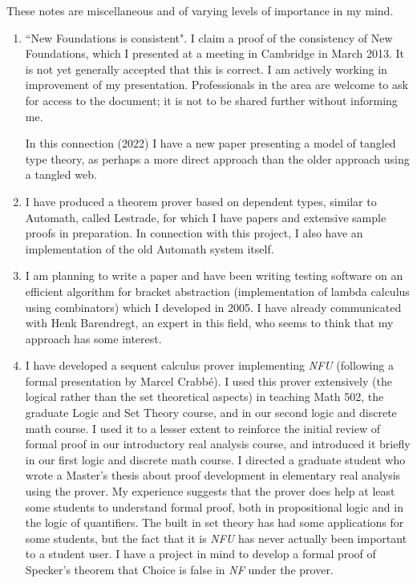 \begin{description}
These notes are miscellaneous and of varying levels of importance in my mind.

\begin{enumerate}

\item ``New Foundations is consistent".  I claim a proof of the consistency of New Foundations, which I presented at a meeting in Cambridge in March 2013.  It is not yet generally accepted that this is correct.  I am actively working in improvement of my presentation.   Professionals in the area are welcome to ask for access to the document; it is not to be shared further without informing me.

In this connection (2022) I have a new paper presenting a model of tangled type theory, as perhaps a more direct approach than the older approach using a tangled web.

\item  I have produced a theorem prover based on dependent types, similar to Automath, called Lestrade,
for which I have papers and extensive sample proofs in preparation.  In connection with this project, I also
have an implementation of the old Automath system itself.

\item I am planning to write a paper and have been writing testing
software on an efficient algorithm for bracket abstraction
(implementation of lambda calculus using combinators) which I
developed in 2005.  I have already communicated with Henk Barendregt,
an expert in this field, who seems to think that my approach has some
interest.

\item I have developed a sequent calculus prover implementing {\em
NFU\/} (following a formal presentation by Marcel Crabb\'e).  I used
this prover extensively (the logical rather than the set theoretical
aspects) in teaching Math 502, the graduate Logic and Set Theory
course, and in our second logic and discrete math course.  I used it
to a lesser extent to reinforce the initial review of formal proof in
our introductory real analysis course, and introduced it briefly in
our first logic and discrete math course.  I directed a graduate
student who wrote a Master's thesis about proof development in
elementary real analysis using the prover.   My
experience suggests that the prover does help at least some students to understand
formal proof, both in propositional logic and in the logic of
quantifiers.  The built in set theory has had some applications for
some students, but the fact that it is {\em NFU\/} has never actually
been important to a student user.  I have a project in mind to develop
a formal proof of Specker's theorem that Choice is false in {\em NF\/}
under the prover.


\end{enumerate}
\end{description}
